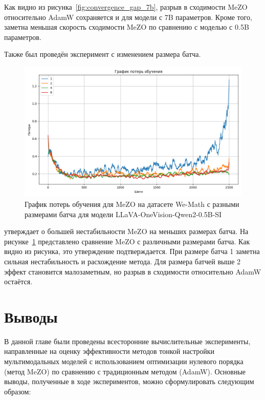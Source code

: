 \documentclass[LI,KR]{HSEUniversity}
\begin{document}
Как видно из рисунка~\ref{fig:convergence_gap_7b}, разрыв в сходимости MeZO относительно AdamW сохраняется и для модели с 7B параметров.
Кроме того, заметна меньшая скорость сходимости MeZO по сравнению с моделью с 0.5B параметров.

Также был проведён эксперимент с изменением размера батча.

\begin{figure}[H]
    \centering
    \includegraphics[width=\textwidth]{images/convergence_with_batches_full}
    \caption{График потерь обучения для MeZO на датасете We-Math с разными размерами батча для модели LLaVA-OneVision-Qwen2-0.5B-SI}
    \label{fig:convergence_with_batches}
\end{figure}

\cite{mezo-svrg} утверждает о большей нестабильности MeZO на меньших размерах батча.
На рисунке~\ref{fig:convergence_with_batches} представлено сравнение MeZO с различными размерами батча.
Как видно из рисунка, это утверждение подтверждается.
При размере батча 1 заметна сильная нестабильность и расхождение метода.
Для размера батчей выше 2 эффект становится малозаметным, но разрыв в сходимости относительно AdamW остаётся.

\section*{Выводы}

В данной главе были проведены всесторонние вычислительные эксперименты, направленные на оценку эффективности методов тонкой настройки мультимодальных моделей с использованием оптимизации нулевого порядка (метод MeZO) по сравнению с традиционным методом (AdamW).
Основные выводы, полученные в ходе экспериментов, можно сформулировать следующим образом:
\end{document}
